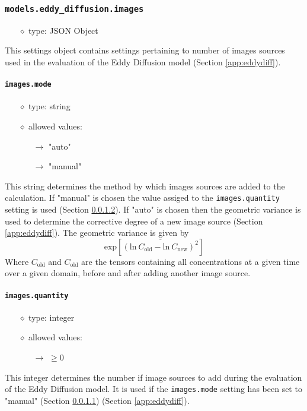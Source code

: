 \documentclass[]{article}
\def\code#1{\texttt{#1}}
\begin{document}
\subsubsection{\code{models.eddy\_diffusion.images}}
\begin{itemize}
    \item[$\diamond$] type: JSON Object 
\end{itemize}
This settings object contains settings pertaining to number of images sources
used in the evaluation of the Eddy Diffusion model (Section \ref{app:eddydiff}).

\paragraph{\code{images.mode}}\label{sec:imagemode}
\begin{itemize}
    \item[$\diamond$] type: string 
    \item[$\diamond$] allowed values:
    \begin{itemize}
        \item[$\rightarrow$] "auto"
        \item[$\rightarrow$] "manual"
    \end{itemize}
\end{itemize}
This string determines the method by which images sources are added to the
calculation. If "manual" is chosen the value assiged to the
\code{images.quantity} setting  is used (Section
\ref{sec:imagequant}). If "auto" is chosen then the geometric variance is used
to determine the corrective degree of a new image source (Section
\ref{app:eddydiff}). The geometric variance is given by
\begin{equation}
    \text{exp}\left[\overline{\left(\text{ln}~C_{\text{old}}-\text{ln}~C_{\text{new}}\right)^{2}}\right]
\end{equation}
Where $C_{\text{old}}$ and $C_{\text{old}}$ are the tensors containing all
concentrations at a given time over a given domain, before and after adding
another image source.


\paragraph{\code{images.quantity}}\label{sec:imagequant}
\begin{itemize}
    \item[$\diamond$] type: integer 
    \item[$\diamond$] allowed values:
    \begin{itemize}
        \item[$\rightarrow$] $\geq 0$
    \end{itemize}
\end{itemize}
This integer determines the number if image sources to add during the evaluation
of the Eddy Diffusion model. It is used if the
\code{images.mode} setting has been set to "manual"
(Section \ref{sec:imagemode}) (Section \ref{app:eddydiff}).
\end{document}
